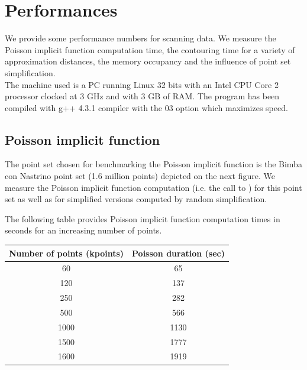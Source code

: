 \section{Performances}
\label{surface_reconstruction_section_performances}

We provide some performance numbers for scanning data. We measure the Poisson implicit function computation time, the contouring time for a variety of approximation distances, the memory occupancy and the influence of point set simplification.\\
The machine used is a PC running Linux 32 bits with an Intel CPU Core 2 processor clocked at 3 GHz and with 3 GB of RAM. The program has been compiled with g++ 4.3.1 compiler with the 03 option which maximizes speed.

\subsection{Poisson implicit function}

The point set chosen for benchmarking the Poisson implicit function is the Bimba con Nastrino point set (1.6 million points) depicted on the next figure. We measure the Poisson implicit function computation (i.e. the call to ) for this point set as well as for simplified versions computed by random simplification.

The following table provides Poisson implicit function computation times in seconds for an increasing number of points.

\begin{tabular}{|c|c|}
  \hline
  Number of points (kpoints) & Poisson duration (sec) \\
  \hline
  60                         & 65 \\
  120                        & 137 \\
  250                        & 282 \\
  500                        & 566 \\
  1000                       & 1130 \\
  1500                       & 1777 \\
  1600                       & 1919 \\
  \hline
\end{tabular}

